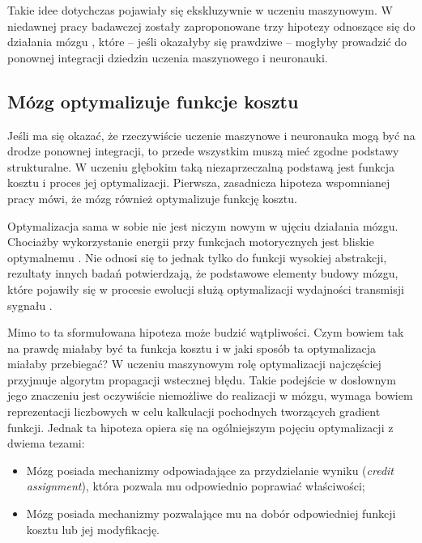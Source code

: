 Takie idee dotychczas pojawiały się ekskluzywnie w uczeniu maszynowym.
W niedawnej pracy badawczej zostały zaproponowane trzy hipotezy odnoszące się do działania mózgu \cite{marblestone2016toward}, które -- jeśli okazałyby się prawdziwe -- mogłyby prowadzić do ponownej integracji dziedzin uczenia maszynowego i neuronauki.

\subsection{Mózg optymalizuje funkcje kosztu}
\label{subsec:brain-optimizes-cost-function}

Jeśli ma się okazać, że rzeczywiście uczenie maszynowe i neuronauka mogą być na drodze ponownej integracji, to przede wszystkim muszą mieć zgodne podstawy strukturalne.
W uczeniu głębokim taką niezaprzeczalną podstawą jest funkcja kosztu i proces jej optymalizacji.
Pierwsza, zasadnicza hipoteza wspomnianej pracy \cite{marblestone2016toward} mówi, że mózg również optymalizuje funkcję kosztu.

Optymalizacja sama w sobie nie jest niczym nowym w ujęciu działania mózgu.
Chociażby wykorzystanie energii przy funkcjach motorycznych jest bliskie optymalnemu \cite{taylor2011does}.
Nie odnosi się to jednak tylko do funkcji wysokiej abstrakcji, rezultaty innych badań potwierdzają, że podstawowe elementy budowy mózgu, które pojawiły się w procesie ewolucji służą optymalizacji wydajności transmisji sygnału \cite{paprocki2020optimizing}.

Mimo to ta sformułowana hipoteza może budzić wątpliwości.
Czym bowiem tak na prawdę miałaby być ta funkcja kosztu i w jaki sposób ta optymalizacja miałaby przebiegać?
W uczeniu maszynowym rolę optymalizacji najczęściej przyjmuje algorytm propagacji wstecznej błędu.
Takie podejście w dosłownym jego znaczeniu jest oczywiście niemożliwe do realizacji w mózgu, wymaga bowiem reprezentacji liczbowych w celu kalkulacji pochodnych tworzących gradient funkcji.
Jednak ta hipoteza opiera się na ogólniejszym pojęciu optymalizacji z dwiema tezami:

\begin{itemize}
	\item Mózg posiada mechanizmy odpowiadające za przydzielanie wyniku (\emph{credit assignment}), która pozwala mu odpowiednio poprawiać właściwości;
	\item Mózg posiada mechanizmy pozwalające mu na dobór odpowiedniej funkcji kosztu lub jej modyfikację.
\end{itemize}

